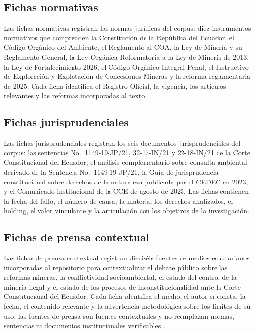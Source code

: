 \subsection{Fichas normativas}

Las fichas normativas registran las normas jurídicas del corpus: diez instrumentos normativos que comprenden la Constitución de la República del Ecuador, el Código Orgánico del Ambiente, el Reglamento al COA, la Ley de Minería y su Reglamento General, la Ley Orgánica Reformatoria a la Ley de Minería de 2013, la Ley de Fortalecimiento 2026, el Código Orgánico Integral Penal, el Instructivo de Exploración y Explotación de Concesiones Mineras y la reforma reglamentaria de 2025. Cada ficha identifica el Registro Oficial, la vigencia, los artículos relevantes y las reformas incorporadas al texto.

\subsection{Fichas jurisprudenciales}

Las fichas jurisprudenciales registran los seis documentos jurisprudenciales del corpus: las sentencias No.\ 1149-19-JP/21, 32-17-IN/21 y 22-18-IN/21 de la Corte Constitucional del Ecuador, el análisis complementario sobre consulta ambiental derivado de la Sentencia No.\ 1149-19-JP/21, la Guía de jurisprudencia constitucional sobre derechos de la naturaleza publicada por el CEDEC en 2023, y el Comunicado institucional de la CCE de agosto de 2025. Las fichas contienen la fecha del fallo, el número de causa, la materia, los derechos analizados, el holding, el valor vinculante y la articulación con los objetivos de la investigación.

\subsection{Fichas de prensa contextual}

Las fichas de prensa contextual registran dieciséis fuentes de medios ecuatorianos incorporadas al repositorio para contextualizar el debate público sobre las reformas mineras, la conflictividad socioambiental, el estado del control de la minería ilegal y el estado de los procesos de inconstitucionalidad ante la Corte Constitucional del Ecuador. Cada ficha identifica el medio, el autor si consta, la fecha, el contenido relevante y la advertencia metodológica sobre los límites de su uso: las fuentes de prensa son fuentes contextuales y no reemplazan normas, sentencias ni documentos institucionales verificables \parencite{primicias_demandas_2026}.

